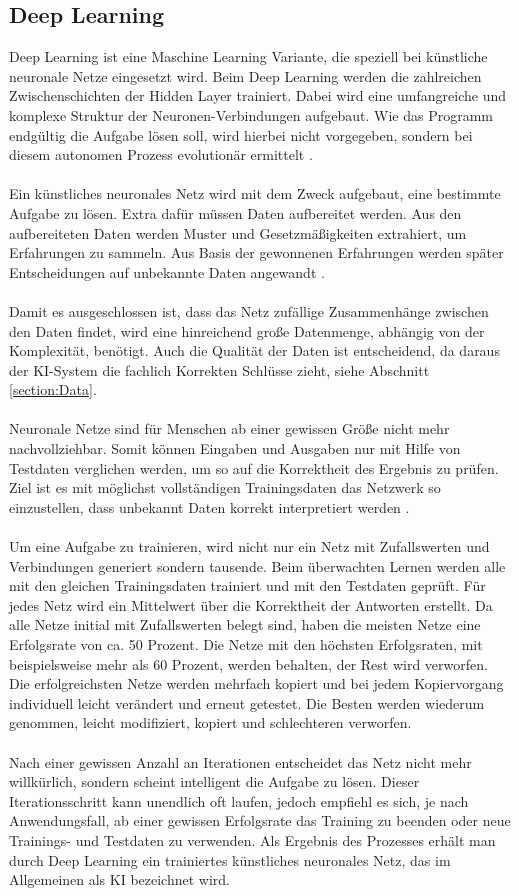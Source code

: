\documentclass[12pt,oneside,a4paper,parskip]{scrbook}
\begin{document}
\subsection{Deep Learning}
Deep Learning ist eine Maschine Learning Variante, die speziell bei künstliche neuronale Netze eingesetzt wird. Beim Deep Learning werden die zahlreichen Zwischenschichten der Hidden Layer trainiert. Dabei wird eine umfangreiche und komplexe Struktur der Neuronen-Verbindungen aufgebaut. Wie das Programm endgültig die Aufgabe lösen soll, wird hierbei nicht vorgegeben, sondern bei diesem autonomen Prozess evolutionär ermittelt \cite{Grundlagen}.
\\\\
Ein künstliches neuronales Netz wird mit dem Zweck aufgebaut, eine bestimmte Aufgabe zu lösen. Extra dafür müssen Daten aufbereitet werden. Aus den aufbereiteten Daten werden Muster und Gesetzmäßigkeiten extrahiert, um Erfahrungen zu sammeln. Aus Basis der gewonnenen Erfahrungen werden später Entscheidungen auf unbekannte Daten angewandt \cite{Grundlagen}.
\\\\
Damit es ausgeschlossen ist, dass das Netz zufällige Zusammenhänge zwischen den Daten findet, wird eine hinreichend große Datenmenge, abhängig von der Komplexität, benötigt. Auch die Qualität der Daten ist entscheidend, da daraus der KI-System die fachlich Korrekten Schlüsse zieht, siehe Abschnitt \ref{section:Data}.
\\\\
Neuronale Netze sind für Menschen ab einer gewissen Größe nicht mehr nachvollziehbar. Somit können Eingaben und Ausgaben nur mit Hilfe von Testdaten verglichen werden, um so auf die Korrektheit des Ergebnis zu prüfen. Ziel ist es mit möglichst vollständigen Trainingsdaten das Netzwerk so einzustellen, dass unbekannt Daten korrekt interpretiert werden \cite{Grundlagen}.
\\\\
Um eine Aufgabe zu trainieren, wird nicht nur ein Netz mit Zufallswerten und Verbindungen generiert sondern tausende. Beim überwachten Lernen werden alle mit den gleichen Trainingsdaten trainiert und mit den Testdaten geprüft. Für jedes Netz wird ein Mittelwert über die Korrektheit der Antworten erstellt. Da alle Netze initial mit Zufallswerten belegt sind, haben die meisten Netze eine Erfolgsrate von ca. 50 Prozent. Die Netze mit den höchsten Erfolgsraten, mit beispielsweise mehr als 60 Prozent, werden behalten, der Rest wird verworfen. Die erfolgreichsten Netze werden mehrfach kopiert und bei jedem Kopiervorgang individuell leicht verändert und erneut getestet. Die Besten werden wiederum genommen, leicht modifiziert, kopiert und schlechteren verworfen.
\\\\
Nach einer gewissen Anzahl an Iterationen entscheidet das Netz nicht mehr willkürlich, sondern scheint intelligent die Aufgabe zu lösen. Dieser Iterationsschritt kann unendlich oft laufen, jedoch empfiehl es sich, je nach Anwendungsfall, ab einer gewissen Erfolgsrate das Training zu beenden oder neue Trainings- und Testdaten zu verwenden. Als Ergebnis des Prozesses erhält man durch Deep Learning ein trainiertes künstliches neuronales Netz, das im Allgemeinen als KI bezeichnet wird.
\end{document}
